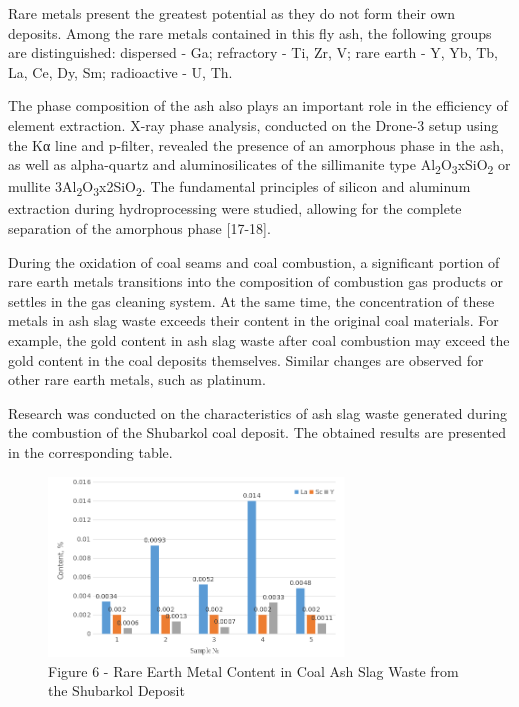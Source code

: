 \begin{multicols}{2}
Rare metals present the greatest potential as they do not form their own
deposits. Among the rare metals contained in this fly ash, the following
groups are distinguished: dispersed - Ga; refractory - Ti, Zr, V; rare
earth - Y, Yb, Tb, La, Ce, Dy, Sm; radioactive - U, Th.

The phase composition of the ash also plays an important role in the
efficiency of element extraction. X-ray phase analysis, conducted on the
Drone-3 setup using the Kα line and p-filter, revealed the presence of
an amorphous phase in the ash, as well as alpha-quartz and
aluminosilicates of the sillimanite type
Al\textsubscript{2}O\textsubscript{3}xSiO\textsubscript{2} or mullite
3Al\textsubscript{2}O\textsubscript{3}x2SiO\textsubscript{2}. The
fundamental principles of silicon and aluminum extraction during
hydroprocessing were studied, allowing for the complete separation of
the amorphous phase {[}17-18{]}.

During the oxidation of coal seams and coal combustion, a significant
portion of rare earth metals transitions into the composition of
combustion gas products or settles in the gas cleaning system. At the
same time, the concentration of these metals in ash slag waste exceeds
their content in the original coal materials. For example, the gold
content in ash slag waste after coal combustion may exceed the gold
content in the coal deposits themselves. Similar changes are observed
for other rare earth metals, such as platinum.

Research was conducted on the characteristics of ash slag waste
generated during the combustion of the Shubarkol coal deposit. The
obtained results are presented in the corresponding table.
\end{multicols}

\begin{figure}[H]
	\centering
	\includegraphics[width=0.7\textwidth]{assets/1084}
	\caption*{Figure 6 - Rare Earth Metal Content in Coal Ash Slag Waste from the Shubarkol Deposit}
\end{figure}

